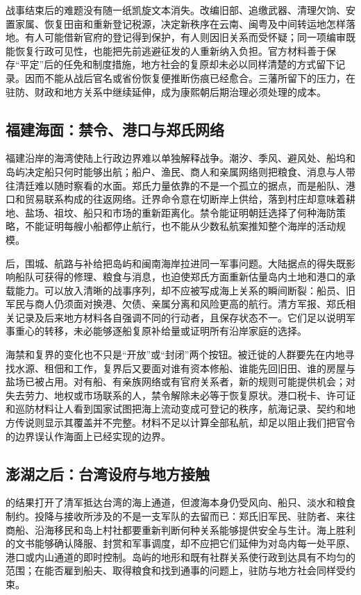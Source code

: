 战事结束后的难题没有随一纸凯旋文本消失。改编旧部、追缴武器、清理欠饷、安置家属、恢复田亩和重新登记税源，决定新秩序在云南、闽粤及中间转运地怎样落地。有人可能借新官府的登记得到保护，有人则因旧关系而受怀疑；同一项编审既能恢复行政可见性，也能把先前逃避征发的人重新纳入负担。官方材料善于保存“平定”后的任免和制度措施，地方社会的复原却未必以同样清楚的方式留下记录。因而不能从战后官名或省份恢复便推断伤痕已经愈合。三藩所留下的压力，在驻防、财政和地方关系中继续延伸，成为康熙朝后期治理必须处理的成本。

\subsection*{福建海面：禁令、港口与郑氏网络}

福建沿岸的海湾使陆上行政边界难以单独解释战争。潮汐、季风、避风处、船坞和岛屿决定船只何时能够出航；船户、渔民、商人和亲属网络则把粮食、消息与人带往清廷难以随时察看的水面。郑氏力量依靠的不是一个孤立的据点，而是船队、港口和贸易联系构成的往返网络。迁界命令意在切断岸上供给，落到村庄却意味着耕地、盐场、祖坟、船只和市场的重新距离化。禁令能证明朝廷选择了何种海防策略，不能证明每艘小船都停止航行，也不能从少数私航案推知整个海岸的活动规模。

后，围城、航路与补给把岛屿和闽南海岸拉进同一军事问题。大陆据点的得失既影响船队可获得的修理、粮食与消息，也迫使郑氏方面重新估量岛内土地和港口的承载能力。可以放入清晰的战事序列，却不应被写成海上关系的瞬间断裂：船员、旧军民与商人仍须面对换港、欠债、亲属分离和风险更高的航行。清方军报、郑氏相关记录及后来地方材料各自强调不同的行动者，且保存状态不一。它们足以说明军事重心的转移，未必能够逐船复原补给量或证明所有沿岸家庭的选择。

海禁和复界的变化也不只是“开放”或“封闭”两个按钮。被迁徙的人群要先在内地寻找水源、租佃和工作，复界后又要面对谁有资本修船、谁能先回旧田、谁的房屋与盐场已被占用。对有船、有亲族网络或有官府关系者，新的规则可能提供机会；对失去劳力、地权或市场联系的人，禁令解除未必等于恢复原状。港口税卡、许可证和巡防材料让人看到国家试图把海上流动变成可登记的秩序，航海记录、契约和地方传说则显示其覆盖并不完整。材料不足以计算全部私航，却足以阻止我们把官令的边界误认作海面上已经实现的边界。

\subsection*{澎湖之后：台湾设府与地方接触}

的结果打开了清军抵达台湾的海上通道，但渡海本身仍受风向、船只、淡水和粮食制约。投降与接收所涉及的不是一支军队的去留而已：郑氏旧军民、驻防者、来往商船、沿海移民和岛上村社都要重新判断何种关系能够提供安全与生计。海上胜利的文书能够确认降服、封赏和军事调度，却不应把它们延伸为对岛内每一处平原、港口或内山通道的即时控制。岛屿的地形和既有社群关系使行政到达具有不均匀的范围；在能否雇到船夫、取得粮食和找到通事的问题上，驻防与地方社会同样受约束。

